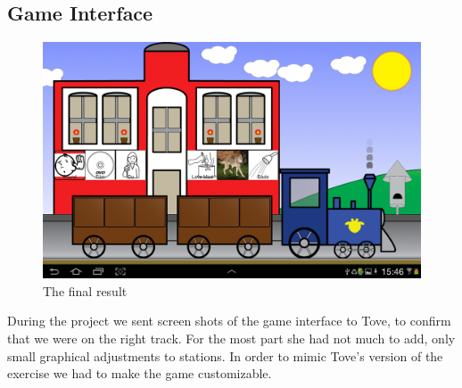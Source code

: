\subsection{Game Interface}
\begin{figure}[H]
\centering
\includegraphics[width=0.9\linewidth]{img/screenshots/gamedesign1.jpg}%
\caption{The final result}
\label{fig:finalresult}
\end{figure}
During the project we sent screen shots of the game interface to Tove, to confirm that we were on the right track. For the most part she had not much to add, only small graphical adjustments to stations. In order to mimic Tove's version of the exercise we had to make the game customizable.

